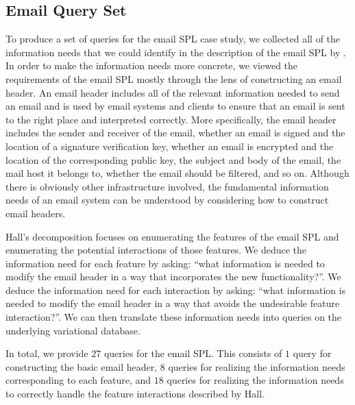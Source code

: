 \subsection{Email Query Set}
\label{app:enron-qs}


To produce a set of queries for the email SPL case study, we collected all of
the information needs that we could identify in the description of the email
SPL by \citet{Hall05}. In order to make the information needs more concrete, we
viewed the requirements of the email SPL mostly through the lens of
constructing an email header.
%
An email header includes all of the relevant information needed to send an
email and is used by email systems and clients to ensure that an email is sent to
the right place and interpreted correctly. 
More specifically, the email header
includes the sender and receiver of the email, whether an email is signed and
the location of a signature verification key, whether an email is encrypted and
the location of the corresponding public key, the subject and body of the
email, the mail host it belongs to, whether the email should be filtered,
and so on.
%
Although there is obviously other infrastructure involved, the fundamental
information needs of an email system can be understood by considering how to
construct email headers.


Hall's decomposition focuses on enumerating the features of the email SPL and
enumerating the potential interactions of those features.
%
We deduce the information need for each feature by asking: ``what information
is needed to modify the email header in a way that incorporates the new
functionality?''. We deduce the information need for each interaction by
asking: ``what information is needed to modify the email header in a way that
avoids the undesirable feature interaction?''.
%
We can then translate these information needs into queries on the underlying
variational database.


In total, we provide $27$ queries for the email SPL.
%
%
This consists of $1$ query for constructing the basic email header, $8$ queries
for realizing the information needs corresponding to each feature, and $18$
queries for realizing the information needs to correctly handle the feature
interactions described by Hall.


